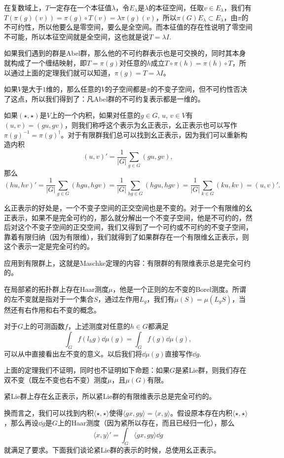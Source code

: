 \documentclass[9pt]{extarticle}
\begin{document}
在复数域上，$T$一定存在一个本征值$\lambda$，令$E_\lambda$是$\lambda$的本征空间，任取$v\in E_\lambda$，我们有$T(\pi(g)(v))=\pi(g)\circ T(v)=\lambda\pi(g)(v)$，所以$\pi(G)E_\lambda\subset E_\lambda$，由$\pi$的不可约性，所以他要么是零空间，要么是全空间。而本征值的存在性说明了零空间不可能，所以本征空间就是全空间，这也就是说$T=\lambda I$.

\para 如果我们遇到的群是Abel群，那么他的不可约群表示也是可交换的，同时其本身就构成了一个缠结映射，即$T=\pi(g)$对任意的$h$成立$T\circ \pi(h)=\pi(h)\circ T$，所以通过上面的定理我们就可以知道，$\pi(g)=T=\lambda I$。

如果$V$是大于$1$维的，那么任意的$V$的子空间都是$\pi$的不变子空间，但不可约性否决了这点，所以我们得到了：凡Abel群的不可约复表示都是一维的。

\para 如果$(\star,\star)$是$V$上的一个内积，如果对任意的$g\in G$, $u$, $v\in V$有$(u,v)=(gu,gv)$，则我们称呼这个表示为幺正表示，幺正表示也可以写作$\pi(g)^{-1}=\pi(g)^\dag$。对于有限群我们总可以找到幺正表示，因为我们可以重新构造内积
\[
	(u,v)'=\frac{1}{|G|}\sum_{g\in G}(gu,gv),
\]
那么
\[
	(hu,hv)'=\frac{1}{|G|}\sum_{g\in G}(hgu,hgv)=\frac{1}{|G|}\sum_{hg\in G}(hgu,hgv)=\frac{1}{|G|}\sum_{k\in G}(ku,kv)=(u,v)'.
\]

幺正表示的好处是，一个不变子空间的正交空间也是不变的。对于一个有限维的幺正表示，如果不是完全可约的，那么就分解出一个不变子空间，他是不可约的，然后对这个不变子空间的正交空间，我们又得到了一个可约或不可约的不变子空间，靠着有限归纳（因为有限维），我们就得到了如果群存在一个有限维幺正表示，则这个表示一定是完全可约的。

应用到有限群上，这就是Maschke定理的内容：有限群的有限维表示总是完全可约的。 

\theo 在局部紧的拓扑群上存在Haar测度$\mu$，他是一个正则的左不变的Borel测度。所谓的左不变就是指对于一个集合$S$，通过左作用$L_g$，我们有$\mu(S)=\mu(L_gS)$，当然还有右作用和右不变的概念。

对于$G$上的可测函数$f$，上述测度对任意的$h\in G$都满足
\[
	\int_G f(l_h g)\dd \mu(g)=\int_G f(g)\dd \mu(g),
\]
可以从中直接看出左不变的意义。以后我们将$\dd \mu(g)$直接写作$\dd g$.

上面的定理我们不证明，同时也不证明如下命题：如果$G$是紧Lie群，则我们存在双不变（既左不变也右不变）测度$\mu$，且$\mu(G)$有限。

\para 紧Lie群上存在幺正表示，所以紧Lie群的有限维表示总是完全可约的。 

换而言之，我们可以找到内积$\langle \star,\star\rangle$使得$\langle gx,gy\rangle=\langle x,y\rangle$。假设原本存在内积$\langle \star,\star \rangle$，那么再设$\dd g$是$G$上的Haar测度（因为紧所以存在，而且已经归一化），那么
\[
	\langle x,y\rangle'=\int_G \langle gx,gy \rangle \dd g
\]
就满足了要求。下面我们谈论紧Lie群的表示的时候，总使用幺正表示。
\end{document}
